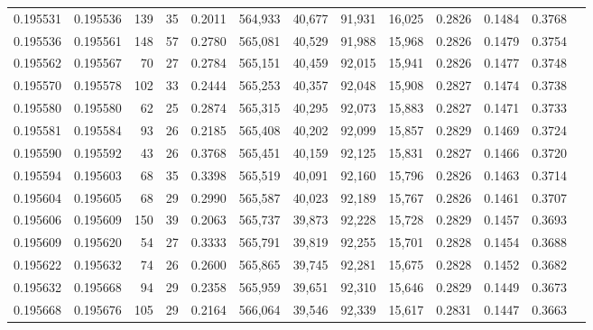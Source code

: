 \begin{tabular}{rrrrrrrrrrrrr}
0.195531 & 0.195536 &   139 &  35 &                                     0.2011 & 564,933 &  40,677 &  91,931 &  16,025 & 0.2826 & 0.1484 & 0.3768 \\
0.195536 & 0.195561 &   148 &  57 &                                     0.2780 & 565,081 &  40,529 &  91,988 &  15,968 & 0.2826 & 0.1479 & 0.3754 \\
0.195562 & 0.195567 &    70 &  27 &                                     0.2784 & 565,151 &  40,459 &  92,015 &  15,941 & 0.2826 & 0.1477 & 0.3748 \\
0.195570 & 0.195578 &   102 &  33 &                                     0.2444 & 565,253 &  40,357 &  92,048 &  15,908 & 0.2827 & 0.1474 & 0.3738 \\
0.195580 & 0.195580 &    62 &  25 &                                     0.2874 & 565,315 &  40,295 &  92,073 &  15,883 & 0.2827 & 0.1471 & 0.3733 \\
0.195581 & 0.195584 &    93 &  26 &                                     0.2185 & 565,408 &  40,202 &  92,099 &  15,857 & 0.2829 & 0.1469 & 0.3724 \\
0.195590 & 0.195592 &    43 &  26 &                                     0.3768 & 565,451 &  40,159 &  92,125 &  15,831 & 0.2827 & 0.1466 & 0.3720 \\
0.195594 & 0.195603 &    68 &  35 &                                     0.3398 & 565,519 &  40,091 &  92,160 &  15,796 & 0.2826 & 0.1463 & 0.3714 \\
0.195604 & 0.195605 &    68 &  29 &                                     0.2990 & 565,587 &  40,023 &  92,189 &  15,767 & 0.2826 & 0.1461 & 0.3707 \\
0.195606 & 0.195609 &   150 &  39 &                                     0.2063 & 565,737 &  39,873 &  92,228 &  15,728 & 0.2829 & 0.1457 & 0.3693 \\
0.195609 & 0.195620 &    54 &  27 &                                     0.3333 & 565,791 &  39,819 &  92,255 &  15,701 & 0.2828 & 0.1454 & 0.3688 \\
0.195622 & 0.195632 &    74 &  26 &                                     0.2600 & 565,865 &  39,745 &  92,281 &  15,675 & 0.2828 & 0.1452 & 0.3682 \\
0.195632 & 0.195668 &    94 &  29 &                                     0.2358 & 565,959 &  39,651 &  92,310 &  15,646 & 0.2829 & 0.1449 & 0.3673 \\
0.195668 & 0.195676 &   105 &  29 &                                     0.2164 & 566,064 &  39,546 &  92,339 &  15,617 & 0.2831 & 0.1447 & 0.3663 \\

\end{tabular}
